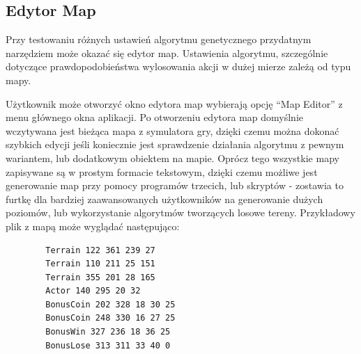 \subsection{Edytor Map}
\begin{par}
Przy testowaniu różnych ustawień algorytmu genetycznego przydatnym narzędziem może okazać się edytor map. 
Ustawienia algorytmu, szczególnie dotyczące prawdopodobieństwa wylosowania akcji w dużej mierze zależą od typu mapy. 
\begin{par}
	Użytkownik może otworzyć okno edytora map wybierają opcję ``Map Editor'' z menu głównego okna aplikacji.
	Po otworzeniu edytora map domyślnie wczytywana jest bieżąca mapa z symulatora gry, dzięki czemu można dokonać szybkich edycji jeśli koniecznie jest sprawdzenie działania algorytmu z pewnym wariantem, lub dodatkowym obiektem na mapie.
	Oprócz tego wszystkie mapy zapisywane są w prostym formacie tekstowym, dzięki czemu możliwe jest generowanie map przy pomocy programów trzecich, lub skryptów - zostawia to furtkę dla bardziej zaawansowanych użytkowników na generowanie dużych poziomów, lub wykorzystanie algorytmów tworzących losowe tereny.
	Przykładowy plik z mapą może wyglądać następująco:
	\begin{lstlisting}
		Terrain 122 361 239 27
		Terrain 110 211 25 151
		Terrain 355 201 28 165
		Actor 140 295 20 32
		BonusCoin 202 328 18 30 25
		BonusCoin 248 330 16 27 25
		BonusWin 327 236 18 36 25
		BonusLose 313 311 33 40 0
	\end{lstlisting}


\end{par}
\end{par}
